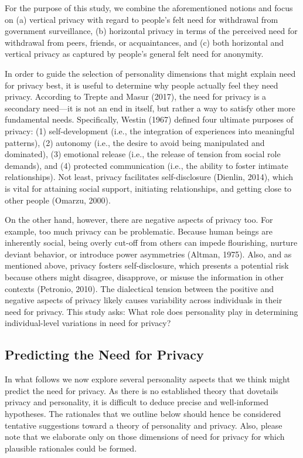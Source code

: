 \documentclass[man,floatsintext]{apa6}
\begin{document}
For the purpose of this study, we combine the aforementioned notions and focus on (a) vertical privacy with regard to people's felt need for withdrawal from government surveillance, (b) horizontal privacy in terms of the perceived need for withdrawal from peers, friends, or acquaintances, and (c) both horizontal and vertical privacy as captured by people's general felt need for anonymity.

In order to guide the selection of personality dimensions that might explain need for privacy best, it is useful to determine why people actually feel they need privacy. According to Trepte and Masur (2017), the need for privacy is a secondary need---it is not an end in itself, but rather a way to satisfy other more fundamental needs. Specifically, Westin (1967) defined four ultimate purposes of privacy: (1) self-development (i.e., the integration of experiences into meaningful patterns), (2) autonomy (i.e., the desire to avoid being manipulated and dominated), (3) emotional release (i.e., the release of tension from social role demands), and (4) protected communication (i.e., the ability to foster intimate relationships). Not least, privacy facilitates self-disclosure (Dienlin, 2014), which is vital for attaining social support, initiating relationships, and getting close to other people (Omarzu, 2000).

On the other hand, however, there are negative aspects of privacy too. For example, too much privacy can be problematic. Because human beings are inherently social, being overly cut-off from others can impede flourishing, nurture deviant behavior, or introduce power asymmetries (Altman, 1975). Also, and as mentioned above, privacy fosters self-disclosure, which presents a potential risk because others might disagree, disapprove, or misuse the information in other contexts (Petronio, 2010). The dialectical tension between the positive and negative aspects of privacy likely causes variability across individuals in their need for privacy. This study asks: What role does personality play in determining individual-level variations in need for privacy?

\hypertarget{predicting-the-need-for-privacy}{%
\subsection{Predicting the Need for Privacy}\label{predicting-the-need-for-privacy}}

In what follows we now explore several personality aspects that we think might predict the need for privacy. As there is no established theory that dovetails privacy and personality, it is difficult to deduce precise and well-informed hypotheses. The rationales that we outline below should hence be considered tentative suggestions toward a theory of personality and privacy. Also, please note that we elaborate only on those dimensions of need for privacy for which plausible rationales could be formed.
\end{document}
